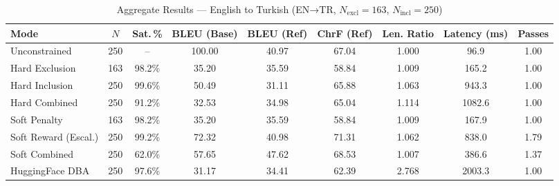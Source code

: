 \documentclass[conference]{IEEEtran}
\begin{document}
\begin{table}[!t]
\caption{Aggregate Results — English to Turkish (EN→TR, $N_{\text{excl}}=163$, $N_{\text{incl}}=250$)}
\label{tab:results_en_tr}
\centering
\begin{tabular}{lcccccccc}
\toprule
Mode & $N$ & Sat.\,\% & BLEU (Base) & BLEU (Ref) & ChrF (Ref) & Len. Ratio & Latency (ms) & Passes \\
\midrule
Unconstrained           & 250 & --     & 100.00 & 40.97 & 67.04 & 1.000 & \phantom{0}96.9 & 1.00 \\
\midrule
Hard Exclusion          & 163 & 98.2\% & \phantom{0}35.20 & 35.59 & 58.84 & 1.009 & 165.2  & 1.00 \\
Hard Inclusion          & 250 & 99.6\% & \phantom{0}50.49 & 31.11 & 65.88 & 1.063 & 943.3  & 1.00 \\
Hard Combined           & 250 & 91.2\% & \phantom{0}32.53 & 34.98 & 65.04 & 1.114 & 1082.6 & 1.00 \\
\midrule
Soft Penalty            & 163 & 98.2\% & \phantom{0}35.20 & 35.59 & 58.84 & 1.009 & 167.9  & 1.00 \\
Soft Reward (Escal.)    & 250 & 99.2\% & \phantom{0}72.32 & 40.98 & 71.31 & 1.062 & 838.0  & 1.79 \\
Soft Combined           & 250 & 62.0\% & \phantom{0}57.65 & 47.62 & 68.53 & 1.007 & 386.6  & 1.37 \\
\midrule
HuggingFace DBA         & 250 & 97.6\% & \phantom{0}31.17 & 34.41 & 62.39 & 2.768  & 2003.3 & 1.00 \\
\bottomrule
\end{tabular}
\end{table}
\end{document}
